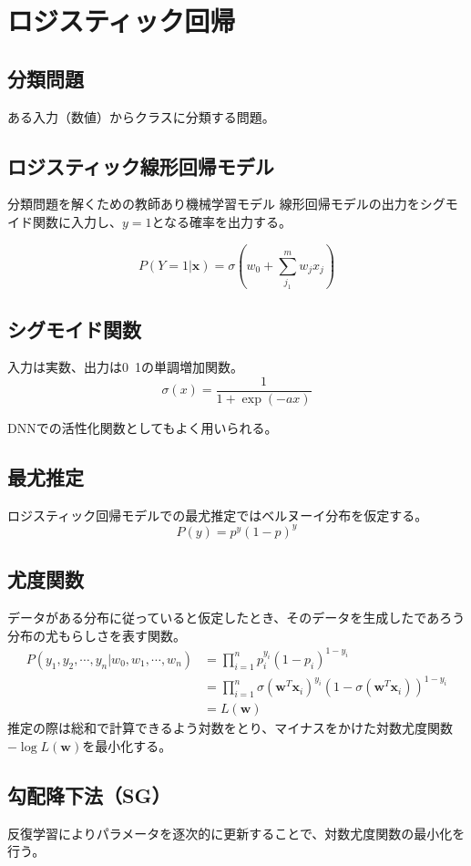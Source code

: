\documentclass[b5paper,12pt]{jarticle}
\begin{document}
\section{ロジスティック回帰}

\subsection{分類問題}
ある入力（数値）からクラスに分類する問題。

\subsection{ロジスティック線形回帰モデル}
分類問題を解くための教師あり機械学習モデル
線形回帰モデルの出力をシグモイド関数に入力し、$y=1$となる確率を出力する。

\[
  P(Y = 1|\boldsymbol{x}) = \sigma(w_0 + \sum_{j_1}^{m}w_j x_j)
\]

\subsection{シグモイド関数}
入力は実数、出力は0~1の単調増加関数。
\[
  \sigma (x) = \frac{1}{1+\exp (-ax)}
\]

DNNでの活性化関数としてもよく用いられる。


\subsection{最尤推定}
ロジスティック回帰モデルでの最尤推定ではベルヌーイ分布を仮定する。
\[
  P(y) = p^y (1-p)^y
\]

\subsection{尤度関数}
データがある分布に従っていると仮定したとき、そのデータを生成したであろう分布の尤もらしさを表す関数。
\begin{align*}
  P(y_1, y_2, \cdots, y_n| w_0, w_1, \cdots, w_n) &= \prod_{i=1}^{n} p_i^{y_i} (1-p_i)^{1-y_i} \\
  &= \prod_{i=1}^{n} {\sigma (\boldsymbol{w}^T \boldsymbol{x}_i)}^{y_i} 
  (1-{\sigma (\boldsymbol{w}^T \boldsymbol{x}_i)})^{1-y_i} \\
  &= L(\boldsymbol{w})
\end{align*}
推定の際は総和で計算できるよう対数をとり、マイナスをかけた対数尤度関数$-\log L(\boldsymbol{w})$を最小化する。

\subsection{勾配降下法（SG）}
反復学習によりパラメータを逐次的に更新することで、対数尤度関数の最小化を行う。
\end{document}
